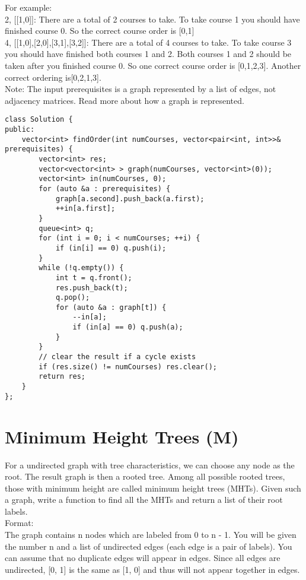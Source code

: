 For example:\\
2, [[1,0]]: There are a total of 2 courses to take. To take course 1 you should have finished course 0. So the correct course order is [0,1]\\
4, [[1,0],[2,0],[3,1],[3,2]]: There are a total of 4 courses to take. To take course 3 you should have finished both courses 1 and 2. Both courses 1 and 2 should be taken after you finished course 0. So one correct course order is [0,1,2,3]. Another correct ordering is[0,2,1,3].\\

Note:
The input prerequisites is a graph represented by a list of edges, not adjacency matrices. Read more about how a graph is represented.\\

\begin{lstlisting}
class Solution {
public:
    vector<int> findOrder(int numCourses, vector<pair<int, int>>& prerequisites) {
        vector<int> res;
        vector<vector<int> > graph(numCourses, vector<int>(0));
        vector<int> in(numCourses, 0);
        for (auto &a : prerequisites) {
            graph[a.second].push_back(a.first);
            ++in[a.first];
        }
        queue<int> q;
        for (int i = 0; i < numCourses; ++i) {
            if (in[i] == 0) q.push(i);
        }
        while (!q.empty()) {
            int t = q.front();
            res.push_back(t);
            q.pop();
            for (auto &a : graph[t]) {
                --in[a];
                if (in[a] == 0) q.push(a);
            }
        }
        // clear the result if a cycle exists
        if (res.size() != numCourses) res.clear();
        return res;
    }
};
\end{lstlisting}


\section{Minimum Height Trees (M)}
For a undirected graph with tree characteristics, we can choose any node as the root. The result graph is then a rooted tree. Among all possible rooted trees, those with minimum height are called minimum height trees (MHTs). Given such a graph, write a function to find all the MHTs and return a list of their root labels.\\

Format:\\
The graph contains n nodes which are labeled from 0 to n - 1. You will be given the number n and a list of undirected edges (each edge is a pair of labels). You can assume that no duplicate edges will appear in edges. Since all edges are undirected, [0, 1] is the same as [1, 0] and thus will not appear together in edges.\\

